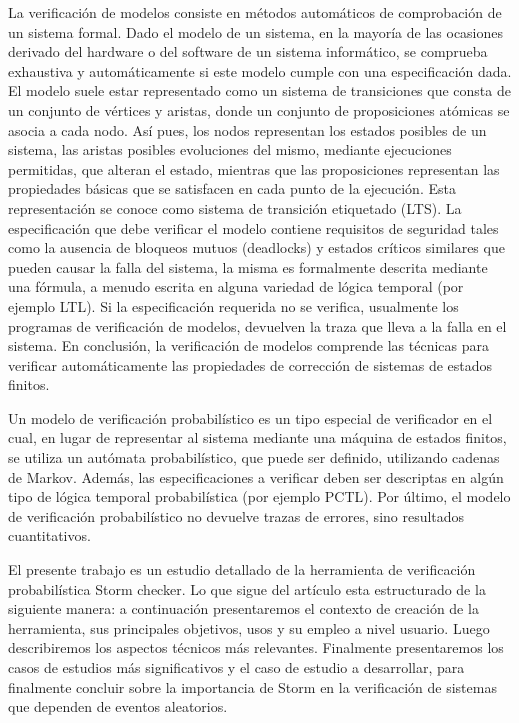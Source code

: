 \documentclass[11pt]{article}
\begin{document}
La verificaci\'on de modelos %
consiste en m\'etodos autom\'aticos de comprobaci\'on de un sistema formal. Dado el modelo de un sistema, en la mayor\'ia de las ocasiones derivado del hardware o del software de un sistema inform\'atico, se comprueba exhaustiva y autom\'aticamente si este modelo cumple con una especificaci\'on dada. El modelo suele estar representado como un sistema de transiciones %
que consta de un conjunto de v\'ertices y aristas, donde un conjunto de proposiciones at\'omicas se asocia a cada nodo. As\'i pues, los nodos representan los estados posibles de un sistema, las aristas posibles evoluciones del mismo, mediante ejecuciones permitidas, que alteran el estado, mientras que las proposiciones representan las propiedades b\'asicas que se satisfacen en cada punto de la ejecuci\'on. Esta representaci\'on se conoce como sistema de transici\'on etiquetado (LTS). La especificaci\'on que debe verificar el modelo contiene requisitos de seguridad tales como la ausencia de bloqueos mutuos (deadlocks) y estados cr\'iticos similares que pueden causar la falla del sistema, la misma es formalmente descrita mediante una f\'ormula, a menudo escrita en alguna variedad de l\'ogica temporal (por ejemplo LTL). Si la especificaci\'on requerida no se verifica, usualmente los programas de verificaci\'on de modelos, devuelven la traza que lleva a la falla en el sistema. En conclusi\'on, la verificaci\'on de modelos comprende las t\'ecnicas para verificar autom\'aticamente las propiedades de correcci\'on de sistemas de estados finitos.

Un modelo de verificaci\'on probabil\'istico es un tipo especial de verificador en el cual, en lugar de representar al sistema mediante una m\'aquina de estados finitos, se utiliza un aut\'omata probabil\'istico, que puede ser definido, utilizando cadenas de Markov. Adem\'as, las especificaciones a verificar deben ser descriptas en alg\'un tipo de l\'ogica temporal probabil\'istica (por ejemplo PCTL). Por \'ultimo, el modelo de verificaci\'on probabil\'istico no devuelve trazas de errores, sino resultados cuantitativos.

El presente trabajo es un estudio detallado de la herramienta de verificaci\'on probabil\'istica Storm checker. Lo que sigue del art\'iculo esta estructurado de la siguiente manera: a continuaci\'on presentaremos el contexto de creaci\'on de la herramienta, sus principales objetivos, usos y su empleo a nivel usuario. Luego describiremos los aspectos t\'ecnicos m\'as relevantes. %
Finalmente presentaremos los casos de estudios m\'as significativos y el caso de estudio a desarrollar, para finalmente concluir sobre la importancia de Storm en la verificaci\'on de sistemas que dependen de eventos aleatorios. 
\end{document}
